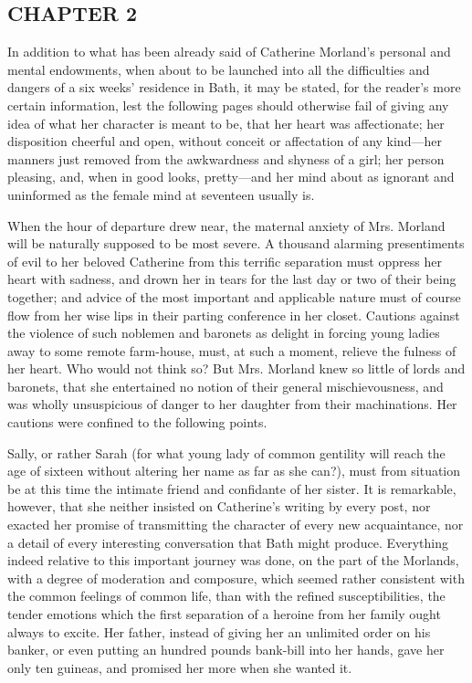 \subsection[chapter-2]{\useURL[url3][][][]\from[url3]CHAPTER 2}

In addition to what has been already said of Catherine Morland's personal and mental endowments, when about to be launched into all the difficulties and dangers of a six weeks' residence in Bath, it may be stated, for the reader's more certain information, lest the following pages should otherwise fail of giving any idea of what her character is meant to be, that her heart was affectionate; her disposition cheerful and open, without conceit or affectation of any kind---her manners just removed from the awkwardness and shyness of a girl; her person pleasing, and, when in good looks, pretty---and her mind about as ignorant and uninformed as the female mind at seventeen usually is.

When the hour of departure drew near, the maternal anxiety of Mrs. Morland will be naturally supposed to be most severe. A thousand alarming presentiments of evil to her beloved Catherine from this terrific separation must oppress her heart with sadness, and drown her in tears for the last day or two of their being together; and advice of the most important and applicable nature must of course flow from her wise lips in their parting conference in her closet. Cautions against the violence of such noblemen and baronets as delight in forcing young ladies away to some remote farm-house, must, at such a moment, relieve the fulness of her heart. Who would not think so? But Mrs. Morland knew so little of lords and baronets, that she entertained no notion of their general mischievousness, and was wholly unsuspicious of danger to her daughter from their machinations. Her cautions were confined to the following points. 

Sally, or rather Sarah (for what young lady of common gentility will reach the age of sixteen without altering her name as far as she can?), must from situation be at this time the intimate friend and confidante of her sister. It is remarkable, however, that she neither insisted on Catherine's writing by every post, nor exacted her promise of transmitting the character of every new acquaintance, nor a detail of every interesting conversation that Bath might produce. Everything indeed relative to this important journey was done, on the part of the Morlands, with a degree of moderation and composure, which seemed rather consistent with the common feelings of common life, than with the refined susceptibilities, the tender emotions which the first separation of a heroine from her family ought always to excite. Her father, instead of giving her an unlimited order on his banker, or even putting an hundred pounds bank-bill into her hands, gave her only ten guineas, and promised her more when she wanted it.

